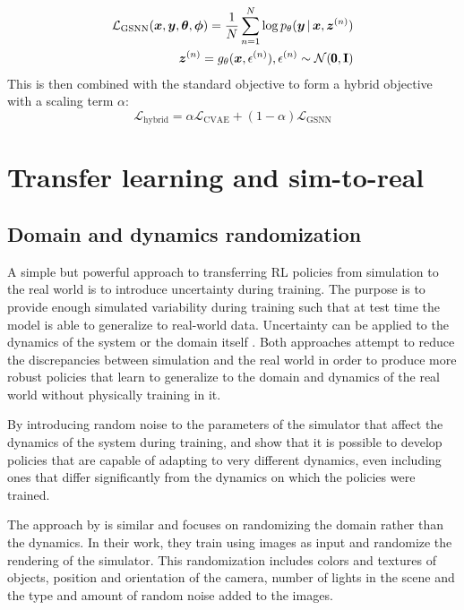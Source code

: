 \begin{equation}
\begin{split}
\mathcal{L}_{\text{GSNN}}(\vx, \vy, \vth, \vph) = \frac{1}{N} \sum_{n=1}^N \log p_\theta \given{\vy}{\vx, \vz^{(n)}}
\\
\vz^{(n)} = g_{\theta}(\vx, \epsilon^{(n)}), \epsilon^{(n)} \sim \mathcal{N}(\pmb{0}, \mathbf{I})
\end{split}
\end{equation}
This is then combined with the standard \cvae{} objective to form a hybrid objective with a scaling term $\alpha$:
\begin{equation}
\mathcal{L}_{\text{hybrid}} = \alpha \mathcal{L}_{\text{CVAE}} + (1 - \alpha) \mathcal{L}_{\text{GSNN}}
\end{equation}

\section{Transfer learning and sim-to-real}
\subsection{Domain and dynamics randomization}

A simple but powerful approach to transferring RL policies from simulation to the real world is to introduce uncertainty during training. The purpose is to provide enough simulated variability during training such that at test time the model is able to generalize to real-world data. Uncertainty can be applied to the dynamics of the system \parencite{Antonova2017}\parencite{peng} or the domain itself \parencite{tobin}. Both approaches attempt to reduce the discrepancies between simulation and the real world in order to produce more robust policies that learn to generalize to the domain and dynamics of the real world without physically training in it. 

By introducing random noise to the parameters of the simulator that affect the dynamics of the system during training, \parencite{Antonova2017} and \parencite{peng} show that it is possible to develop policies that are capable of adapting to very different dynamics, even including ones that differ significantly from the dynamics on which the policies were trained.

The approach by \parencite{tobin} is similar and focuses on randomizing the domain rather than the dynamics. In their work, they train using images as input and randomize the rendering of the simulator. This randomization includes colors and textures of objects, position and orientation of the camera, number of lights in the scene and the type and amount of random noise added to the images.

